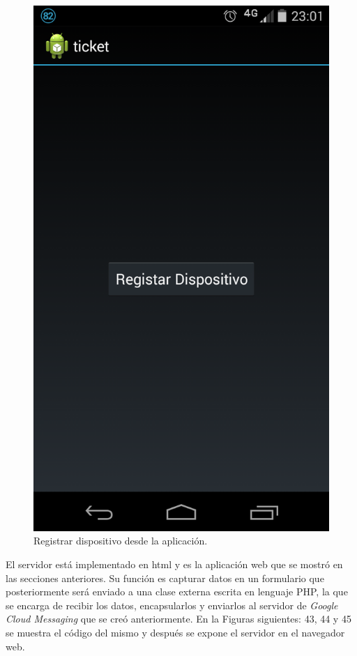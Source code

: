 \begin{figure}[H]
\centering
\includegraphics[scale=0.20]{images/capitulo5/registrarDispositivo.png}
\caption{Registrar dispositivo desde la aplicación.}
\label{registrarDispositivo}
\end{figure}


El servidor está implementado en html y es la aplicación web que se mostró en las secciones anteriores. Su función es capturar datos en un formulario que posteriormente será enviado a una clase externa escrita en lenguaje PHP, la que se encarga de recibir los datos, encapsularlos y enviarlos al servidor de \textit{Google Cloud Messaging} que se creó anteriormente. En la Figuras siguientes: 43, 44 y 45 se muestra el código del mismo y después se expone el servidor en el navegador web.\\

